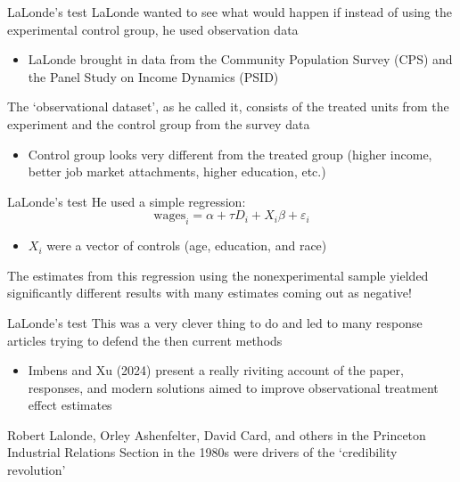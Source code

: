 \documentclass[aspectratio=169,t,11pt,table]{beamer}
\begin{document}
\begin{frame}{LaLonde's test}
  LaLonde wanted to see what would happen if instead of using the experimental control group, he used observation data
	\begin{itemize}
		\item LaLonde brought in data from the Community Population Survey (CPS) and the Panel Study on Income Dynamics (PSID)  
	\end{itemize}

	\bigskip
	The `observational dataset', as he called it, consists of the treated units from the experiment and the control group from the survey data
	\pause
	\begin{itemize}
		\item Control group looks very different from the treated group (higher income, better job market attachments, higher education, etc.)
	\end{itemize}
\end{frame}

\begin{frame}{LaLonde's test}
	He used a simple regression:
	$$
		\text{wages}_i = \alpha + \tau D_i + X_i \beta + \varepsilon_i
	$$
	\begin{itemize}
		\item $X_i$ were a vector of controls (age, education, and race)
	\end{itemize}

	\pause \bigskip
	The estimates from this regression using the nonexperimental sample yielded significantly different results with many estimates coming out as negative!
\end{frame}

\begin{frame}{LaLonde's test}
	This was a very clever thing to do and led to many response articles trying to defend the then current methods
	\begin{itemize}
		\item Imbens and Xu (2024) present a really riviting account of the paper, responses, and modern solutions aimed to improve observational treatment effect estimates
	\end{itemize}

	\pause
	\bigskip
	Robert Lalonde, Orley Ashenfelter, David Card, and others in the Princeton Industrial Relations Section in the 1980s were drivers of the `credibility revolution'
\end{frame}
\end{document}
